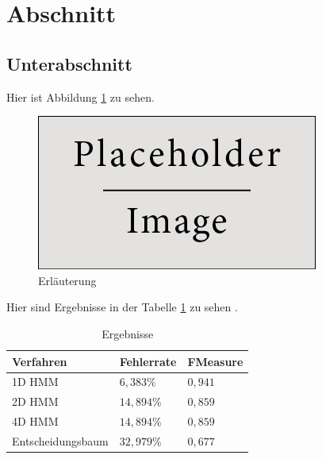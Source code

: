 \section{Abschnitt}

\subsection{Unterabschnitt}


Hier ist Abbildung \ref{fig:demo} zu sehen.

\begin{figure}[h]\centering
	\includegraphics[scale=1]{img/placeholder.jpg}
	\caption{Erläuterung}
	\label{fig:demo}
\end{figure}




Hier sind Ergebnisse in der Tabelle \ref{tab:result} zu sehen \cite{Handl.2010}.

\begin{table}[H]\centering
\begin{tabular}{|l|l|l|} %
\hline
Verfahren   & Fehlerrate & F\-Measure   \\
\hline
1D HMM & $6,383\% $ & $ 0,941 $  \\
\hline
2D HMM & $14,894\% $ & $0,859 $  \\
\hline
4D HMM & $14,894\% $ & $0,859 $  \\
\hline
Entscheidungsbaum & $32,979\% $ & $ 0,677$   \\
\hline
\end{tabular}
\caption{Ergebnisse}
\label{tab:result}
\end{table}